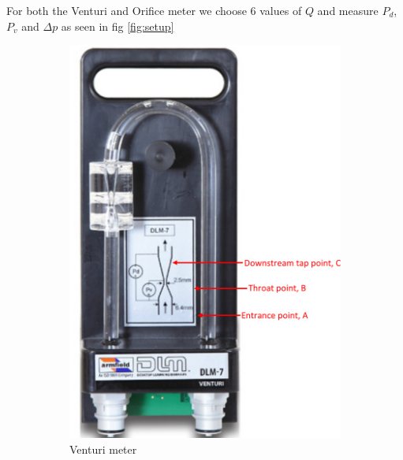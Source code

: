 For both the Venturi and Orifice meter we choose 6 values of $Q$ and measure $P_d$, $P_v$ and $\Delta p$ as seen in fig \ref{fig:setup}

\begin{figure}[h!]
  \begin{subfigure}{0.51\columnwidth}
    \includegraphics[width=\linewidth]{Diagrams/Venturi.jpeg}
    \caption{Venturi meter} 
    \label{fig:Venturi}
  \end{subfigure}%
  \hspace*{\fill}   %
  \begin{subfigure}{0.435\columnwidth}

\end{subfigure}
\end{figure}
